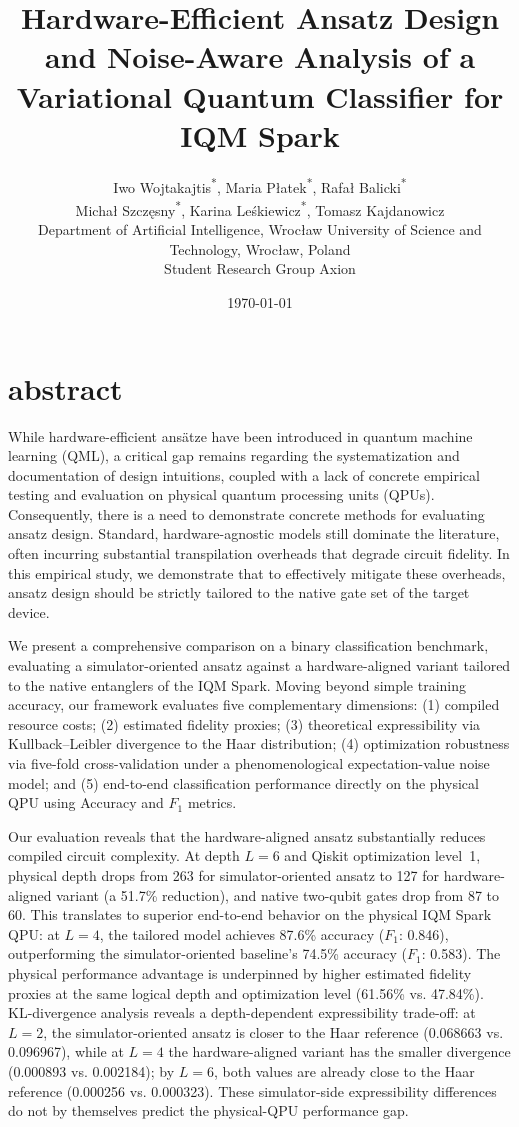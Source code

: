 \documentclass[11pt]{article}
\title{Hardware-Efficient Ansatz Design and Noise-Aware Analysis of a Variational Quantum Classifier for IQM Spark}
\author{
\begin{tabular}{c}
Iwo Wojtakajtis\textsuperscript{*}, Maria P{\l}atek\textsuperscript{*}, Rafa{\l} Balicki\textsuperscript{*}\\
Micha{\l} Szcz{\k{e}}sny\textsuperscript{*}, Karina Le{\'s}kiewicz\textsuperscript{*}, Tomasz Kajdanowicz\\[0.5em]
\small Department of Artificial Intelligence, Wroc{\l}aw University of Science and Technology, Wroc{\l}aw, Poland\\
\small Student Research Group Axion
\end{tabular}
}
\date{\today}
\begin{document}
\maketitle

\section{abstract}
While hardware-efficient ansätze have been introduced in quantum machine learning (QML), a critical gap remains regarding the systematization and documentation of design intuitions, coupled with a lack of concrete empirical testing and evaluation on physical quantum processing units (QPUs). Consequently, there is a need to demonstrate concrete methods for evaluating ansatz design. Standard, hardware-agnostic models still dominate the literature, often incurring substantial transpilation overheads that degrade circuit fidelity. In this empirical study, we demonstrate that to effectively mitigate these overheads, ansatz design should be strictly tailored to the native gate set of the target device.

We present a comprehensive comparison on a binary classification benchmark, evaluating a simulator-oriented ansatz against a hardware-aligned variant tailored to the native entanglers of the IQM Spark. Moving beyond simple training accuracy, our framework evaluates five complementary dimensions: (1) compiled resource costs; (2) estimated fidelity proxies; (3) theoretical expressibility via Kullback--Leibler divergence to the Haar distribution; (4) optimization robustness via five-fold cross-validation under a phenomenological expectation-value noise model; and (5) end-to-end classification performance directly on the physical QPU using Accuracy and $F_1$ metrics.

Our evaluation reveals that the hardware-aligned ansatz substantially reduces compiled circuit complexity. At depth $L=6$ and Qiskit optimization level~1, physical depth drops from 263 for simulator-oriented ansatz to 127 for hardware-aligned variant  (a 51.7\% reduction), and native two-qubit gates drop from 87 to 60. This translates to superior end-to-end behavior on the physical IQM Spark QPU: at $L=4$, the tailored model achieves 87.6\% accuracy ($F_1$: 0.846), outperforming the simulator-oriented baseline's 74.5\% accuracy ($F_1$: 0.583). The physical performance advantage is underpinned by higher estimated fidelity proxies at the same logical depth and optimization level (61.56\% vs. 47.84\%). KL-divergence analysis reveals a depth-dependent expressibility trade-off: at $L=2$, the simulator-oriented ansatz is closer to the Haar reference (0.068663 vs. 0.096967), while at $L=4$ the hardware-aligned variant has the smaller divergence (0.000893 vs. 0.002184); by $L=6$, both values are already close to the Haar reference (0.000256 vs. 0.000323). These simulator-side expressibility differences do not by themselves predict the physical-QPU performance gap.
\end{document}
